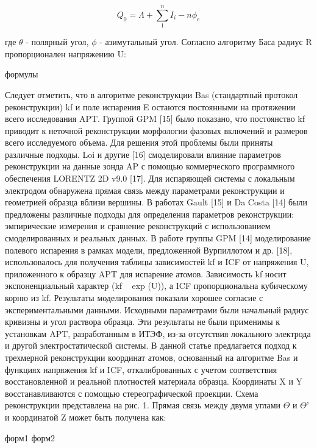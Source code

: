 \begin{equation}
	\label{eq:equation1_1}
	Q_0 = \Lambda + \sum_{1}^{n} I_i -n\phi_e
\end{equation}

где $\theta$ - полярный угол, $\phi$ - азимутальный угол. Согласно алгоритму Баса радиус R пропорционален напряжению U: 

формулы

Следует отметить, что в алгоритме реконструкции Bas (стандартный протокол реконструкции) kf и поле испарения E остаются постоянными на протяжении всего исследования APT. Группой GPM [15] было показано, что постоянство kf приводит к неточной реконструкции морфологии фазовых включений и размеров всего исследуемого объема. Для решения этой проблемы были приняты различные подходы.
Loi и другие [16] смоделировали влияние параметров реконструкции на данные зонда AP с помощью коммерческого программного обеспечения LORENTZ 2D v9.0 [17]. Для испаряющей системы с локальным электродом обнаружена прямая связь между параметрами реконструкции и геометрией образца вблизи вершины.
В работах Gault [15] и Da Costa [14] были предложены различные подходы для определения параметров реконструкции: эмпирические измерения и сравнение реконструкций с использованием смоделированных и реальных данных.
В работе группы GPM [14] моделирование полевого испарения в рамках модели, предложенной Вурпиллотом и др. [18], использовалось для получения таблицы зависимостей kf и ICF от напряжения U, приложенного к образцу APT для испарение атомов. Зависимость kf носит экспоненциальный характер (kf ~ exp (U)), а ICF пропорциональна кубическому корню из kf. Результаты моделирования показали хорошее согласие с экспериментальными данными. Исходными параметрами были начальный радиус кривизны и угол раствора образца. Эти результаты не были применимы к установкам APT, разработанным в ИТЭФ, из-за отсутствия локального электрода и другой электростатической системы.
В данной статье предлагается подход к трехмерной реконструкции координат атомов, основанный на алгоритме Bas и функциях напряжения kf и ICF, откалиброванных с учетом соответствия восстановленной и реальной плотностей материала образца.
Координаты X и Y восстанавливаются с помощью стереографической проекции. Схема реконструкции представлена на рис. 1. Прямая связь между двумя углами $\Theta$ и $\Theta$' и координатой Z может быть получена как:

форм1
форм2

